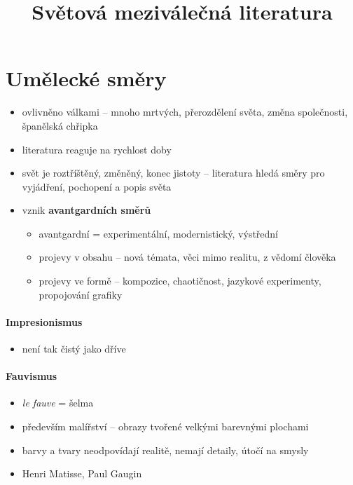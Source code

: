 \title{Světová meziválečná literatura}


\section{Umělecké směry}
\begin{itemize}
\item ovlivněno válkami -- mnoho mrtvých, přerozdělení světa, změna společnosti, španělská chřipka
\item literatura reaguje na rychlost doby
\item svět je roztříštěný, změněný, konec jistoty -- literatura hledá směry pro vyjádření, pochopení a popis světa
\item vznik \textbf{avantgardních směrů}
	\begin{itemize}
	\item avantgardní = experimentální, modernistický, výstřední
	\item projevy v obsahu -- nová témata, věci mimo realitu, z vědomí člověka
	\item projevy ve formě -- kompozice, chaotičnost, jazykové experimenty, propojování grafiky
	\end{itemize}
\end{itemize}

\paragraph{Impresionismus}
\begin{itemize}
\item není tak čistý jako dříve
\end{itemize}

\paragraph{Fauvismus}
\begin{itemize}
\item \textit{le fauve} = šelma
\item především malířství -- obrazy tvořené velkými barevnými plochami
\item barvy a tvary neodpovídají realitě, nemají detaily, útočí na smysly
\item Henri Matisse, Paul Gaugin
\end{itemize}

